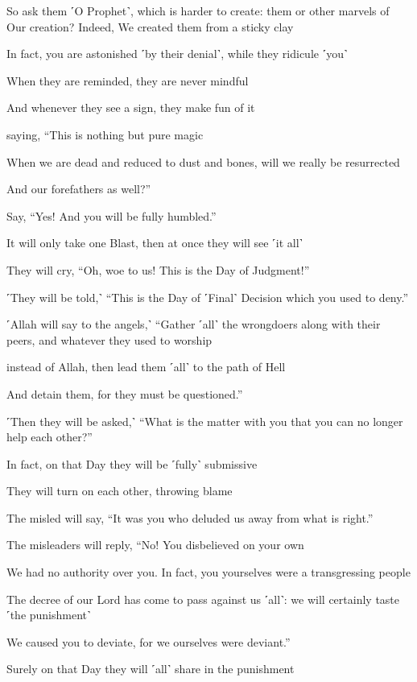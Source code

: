 So ask them ˹O Prophet˺, which is harder to create: them or other marvels of Our creation? Indeed, We created them from a sticky clay

In fact, you are astonished ˹by their denial˺, while they ridicule ˹you˺

When they are reminded, they are never mindful

And whenever they see a sign, they make fun of it

saying, “This is nothing but pure magic

When we are dead and reduced to dust and bones, will we really be resurrected

And our forefathers as well?”

Say, “Yes! And you will be fully humbled.”

It will only take one Blast, then at once they will see ˹it all˺

They will cry, “Oh, woe to us! This is the Day of Judgment!”

˹They will be told,˺ “This is the Day of ˹Final˺ Decision which you used to deny.”

˹Allah will say to the angels,˺ “Gather ˹all˺ the wrongdoers along with their peers, and whatever they used to worship

instead of Allah, then lead them ˹all˺ to the path of Hell

And detain them, for they must be questioned.”

˹Then they will be asked,˺ “What is the matter with you that you can no longer help each other?”

In fact, on that Day they will be ˹fully˺ submissive

They will turn on each other, throwing blame

The misled will say, “It was you who deluded us away from what is right.”

The misleaders will reply, “No! You disbelieved on your own

We had no authority over you. In fact, you yourselves were a transgressing people

The decree of our Lord has come to pass against us ˹all˺: we will certainly taste ˹the punishment˺

We caused you to deviate, for we ourselves were deviant.”

Surely on that Day they will ˹all˺ share in the punishment

